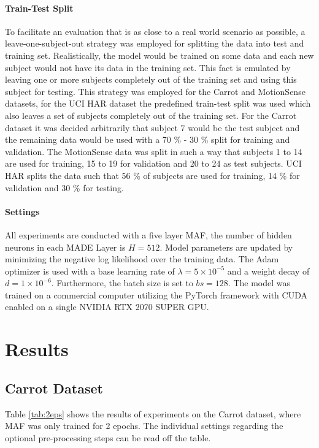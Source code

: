 \documentclass[11pt,titlepage,oneside,openany]{book}
\begin{document}
\paragraph{Train-Test Split}
To facilitate an evaluation that is as close to a real world scenario as possible, a leave-one-subject-out strategy was employed for splitting the data into test and training set. Realistically, the model would be trained on some data and each new subject would not have its data in the training set. This fact is emulated by leaving one or more subjects completely out of the training set and using this subject for testing. This strategy was employed for the Carrot and MotionSense datasets, for the UCI HAR dataset the predefined train-test split was used which also leaves a set of subjects completely out of the training set. For the Carrot dataset it was decided arbitrarily that subject 7 would be the test subject and the remaining data would be used with a 70 \% - 30 \% split for training and validation. The MotionSense data was split in such a way that subjects 1 to 14 are used for training, 15 to 19 for validation and  20 to 24 as test subjects. UCI HAR splits the data such that 56 \% of subjects are used for training, 14 \% for validation and 30 \% for testing.

\paragraph{Settings}
All experiments are conducted with a five layer MAF, the number of hidden neurons in each MADE Layer is $H=512$. Model parameters are updated by minimizing the negative log likelihood over the training data. The Adam optimizer is used with a base learning rate of $\lambda = 5 \times 10^{-5}$ and a weight decay of $d = 1 \times 10^{-6}$. Furthermore, the batch size is set to $bs = 128$. The model was trained on a commercial computer utilizing the PyTorch framework with CUDA enabled on a single NVIDIA RTX 2070 SUPER GPU.


\section{Results}
\label{sec:results}

\subsection{Carrot Dataset}
Table \ref{tab:2eps} shows the results of experiments on the Carrot dataset, where MAF was only trained for 2 epochs. The individual settings regarding the optional pre-processing steps can be read off the table.
\end{document}
